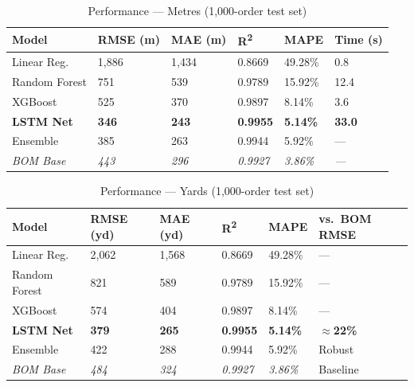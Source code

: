 \begin{table}[htbp]
\centering\footnotesize\caption{Performance --- Metres (1,000-order test set)}\label{tab:perf_m}
\begin{tabularx}{\textwidth}{@{}Z Y Y Y Y Y@{}}
  \toprule
  \textbf{Model}&\textbf{RMSE (m)}&\textbf{MAE (m)}&\textbf{R\textsuperscript{2}}&\textbf{MAPE}&\textbf{Time (s)}\\
  \midrule
  Linear Reg.&1{,}886&1{,}434&0.8669&49.28\%&0.8\\
  Random Forest&751&539&0.9789&15.92\%&12.4\\
  XGBoost&525&370&0.9897&8.14\%&3.6\\
  \textbf{LSTM Net}&\textbf{346}&\textbf{243}&\textbf{0.9955}&\textbf{5.14\%}&\textbf{33.0}\\
  Ensemble&385&263&0.9944&5.92\%&---\\
  \midrule\textit{BOM Base}&\textit{443}&\textit{296}&\textit{0.9927}&\textit{3.86\%}&\textit{---}\\
  \bottomrule
\end{tabularx}
\end{table}

\begin{table}[htbp]
\centering\footnotesize\caption{Performance --- Yards (1,000-order test set)}\label{tab:perf_yd}
\begin{tabularx}{\textwidth}{@{}Z Y Y Y Y Y@{}}
  \toprule
  \textbf{Model}&\textbf{RMSE (yd)}&\textbf{MAE (yd)}&\textbf{R\textsuperscript{2}}&\textbf{MAPE}&\textbf{vs.\ BOM RMSE}\\
  \midrule
  Linear Reg.&2{,}062&1{,}568&0.8669&49.28\%&---\\
  Random Forest&821&589&0.9789&15.92\%&---\\
  XGBoost&574&404&0.9897&8.14\%&---\\
  \textbf{LSTM Net}&\textbf{379}&\textbf{265}&\textbf{0.9955}&\textbf{5.14\%}&\textbf{$\approx$22\%}\\
  Ensemble&422&288&0.9944&5.92\%&Robust\\
  \midrule\textit{BOM Base}&\textit{484}&\textit{324}&\textit{0.9927}&\textit{3.86\%}&Baseline\\
  \bottomrule
\end{tabularx}
\end{table}

